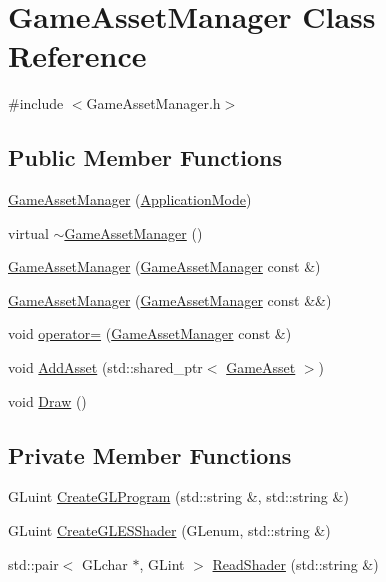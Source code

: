 \hypertarget{class_game_asset_manager}{}\section{Game\+Asset\+Manager Class Reference}
\label{class_game_asset_manager}


{\ttfamily \#include $<$Game\+Asset\+Manager.\+h$>$}

\subsection*{Public Member Functions}
\begin{DoxyCompactItemize}
\item 
\hyperlink{class_game_asset_manager_aaa0d58e276cc10ad91a7457085598a71}{Game\+Asset\+Manager} (\hyperlink{common_8h_add86e7c88dd109abea3f708b422f31f0}{Application\+Mode})
\item 
virtual \hyperlink{class_game_asset_manager_a1270bd61ecbcca563f079803e40c9b77}{$\sim$\+Game\+Asset\+Manager} ()
\item 
\hyperlink{class_game_asset_manager_a2c9adcb72faa154c87eadc9bafe5269d}{Game\+Asset\+Manager} (\hyperlink{class_game_asset_manager}{Game\+Asset\+Manager} const \&)
\item 
\hyperlink{class_game_asset_manager_a44f6e2fd6b8ff1dd64e5697f1be7386d}{Game\+Asset\+Manager} (\hyperlink{class_game_asset_manager}{Game\+Asset\+Manager} const \&\&)
\item 
void \hyperlink{class_game_asset_manager_ac72678a4ad5378c685aa6bae84a4e712}{operator=} (\hyperlink{class_game_asset_manager}{Game\+Asset\+Manager} const \&)
\item 
void \hyperlink{class_game_asset_manager_ad3de8ff00d55ba04728b1de8213b2349}{Add\+Asset} (std\+::shared\+\_\+ptr$<$ \hyperlink{class_game_asset}{Game\+Asset} $>$)
\item 
void \hyperlink{class_game_asset_manager_a32837132bd70a9a9ed537323c2d3d886}{Draw} ()
\end{DoxyCompactItemize}
\subsection*{Private Member Functions}
\begin{DoxyCompactItemize}
\item 
G\+Luint \hyperlink{class_game_asset_manager_abec45b44a8b35ad2d7d817ba10e0dd8d}{Create\+G\+L\+Program} (std\+::string \&, std\+::string \&)
\item 
G\+Luint \hyperlink{class_game_asset_manager_a1a1e5c07f941e8d3fda40d9442ac7037}{Create\+G\+L\+E\+S\+Shader} (G\+Lenum, std\+::string \&)
\item 
std\+::pair$<$ G\+Lchar $\ast$, G\+Lint $>$ \hyperlink{class_game_asset_manager_a23b124a213308a68a882727127601c97}{Read\+Shader} (std\+::string \&)
\end{DoxyCompactItemize}
